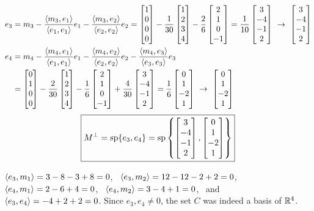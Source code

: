 \begin{example}
\begin{align*}
e_3&=m_3-\frac{\inner{m_3}{e_1}}{\inner{e_1}{e_1}}e_1-\frac{\inner{m_3}{e_2}}{\inner{e_2}{e_2}}e_2
 =\bmat{1\\0\\0\\0}-\frac{1}{30}\bmat{1\\2\\3\\4}-\frac{2}{6}\bmat{2\\1\\0\\-1}=\frac1{10}\bmat{3\\-4\\-1\\2}\ \to\ \bmat{3\\-4\\-1\\2}\\
e_4&=m_4-\frac{\inner{m_4}{e_1}}{\inner{e_1}{e_1}}e_1-\frac{\inner{m_4}{e_2}}{\inner{e_2}{e_2}}e_2-\frac{\inner{m_4}{e_3}}{\inner{e_3}{e_3}}e_3\\
 &=\bmat{0\\1\\0\\0}-\frac{2}{30}\bmat{1\\2\\3\\4}-\frac{1}{6}\bmat{2\\1\\0\\-1}+\frac{4}{30}\bmat{3\\-4\\-1\\2}=\frac16\bmat{0\\1\\-2\\1}\ \to\ \bmat{0\\1\\-2\\1}
\end{align*}
\[
\boxed{M^\perp=\operatorname{sp}\{e_3,e_4\}=\operatorname{sp}\left\{\begin{bmatrix}3\\-4\\-1\\2\end{bmatrix},\begin{bmatrix}0\\1\\-2\\1\end{bmatrix}\right\}}
\]
\begin{insight}[Verification]
$\left\langle e_3, m_1 \right\rangle=3-8-3+8=0$, \ $\left\langle e_3, m_2 \right\rangle=12-12-2+2=0$, \ $\left\langle e_4, m_1 \right\rangle=2-6+4=0$, \ $\left\langle e_4, m_2 \right\rangle=3-4+1=0$, \ and $\left\langle e_3, e_4 \right\rangle=-4+2+2=0$. Since $e_3,e_4\ne0$, the set $C$ was indeed a basis of $\mathbb{R}^4$.


\end{insight}
\end{example}
